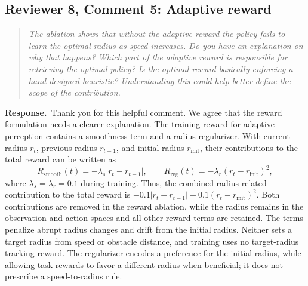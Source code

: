 \documentclass[11pt]{article}
\newenvironment{reviewcomment}{\begin{quote}\color{reviewblue}\itshape}{\end{quote}}
\newcommand{\Response}{\par\noindent\textbf{Response.}\ }
\begin{document}
\subsection*{Reviewer 8, Comment 5: Adaptive reward}
\begin{reviewcomment}
The ablation shows that without the adaptive reward the policy fails to learn the optimal radius as speed increases. Do you have an explanation on why that happens? Which part of the adaptive reward is responsible for retrieving the optimal policy? Is the optimal reward basically enforcing a hand-designed heuristic? Understanding this could help better define the scope of the contribution.
\end{reviewcomment}
\Response Thank you for this helpful comment. We agree that the reward formulation needs a clearer explanation. The training reward for adaptive perception contains a smoothness term and a radius regularizer. With current radius $r_t$, previous radius $r_{t-1}$, and initial radius $r_{\mathrm{init}}$, their contributions to the total reward can be written as
\[
R_{\mathrm{smooth}}(t)=-\lambda_s|r_t-r_{t-1}|,\qquad
R_{\mathrm{reg}}(t)=-\lambda_r(r_t-r_{\mathrm{init}})^2,
\]
where $\lambda_s=\lambda_r=0.1$ during training. Thus, the combined radius-related contribution to the total reward is $-0.1|r_t-r_{t-1}|-0.1(r_t-r_{\mathrm{init}})^2$. Both contributions are removed in the reward ablation, while the radius remains in the observation and action spaces and all other reward terms are retained. The terms penalize abrupt radius changes and drift from the initial radius. Neither sets a target radius from speed or obstacle distance, and training uses no target-radius tracking reward. The regularizer encodes a preference for the initial radius, while allowing task rewards to favor a different radius when beneficial; it does not prescribe a speed-to-radius rule.
\end{document}
